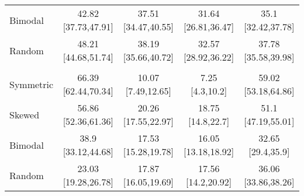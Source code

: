 \begin{tabular}[t]{lcccc}
\hspace{1em}\hspace{1em}Bimodal & 42.82 [37.73,47.91] & 37.51 [34.47,40.55] & 31.64 [26.81,36.47] & 35.1 [32.42,37.78]\\
\hspace{1em}\hspace{1em}Random & 48.21 [44.68,51.74] & 38.19 [35.66,40.72] & 32.57 [28.92,36.22] & 37.78 [35.58,39.98]\\
\addlinespace[0.3em]
\multicolumn{5}{l}{\textbf{30 bins}}\\
\hspace{1em}\hspace{1em}Symmetric & 66.39 [62.44,70.34] & 10.07 [7.49,12.65] & 7.25 [4.3,10.2] & 59.02 [53.18,64.86]\\
\hspace{1em}\hspace{1em}Skewed & 56.86 [52.36,61.36] & 20.26 [17.55,22.97] & 18.75 [14.8,22.7] & 51.1 [47.19,55.01]\\
\hspace{1em}\hspace{1em}Bimodal & 38.9 [33.12,44.68] & 17.53 [15.28,19.78] & 16.05 [13.18,18.92] & 32.65 [29.4,35.9]\\
\hspace{1em}\hspace{1em}Random & 23.03 [19.28,26.78] & 17.87 [16.05,19.69] & 17.56 [14.2,20.92] & 36.06 [33.86,38.26]\\
\bottomrule
\end{tabular}
